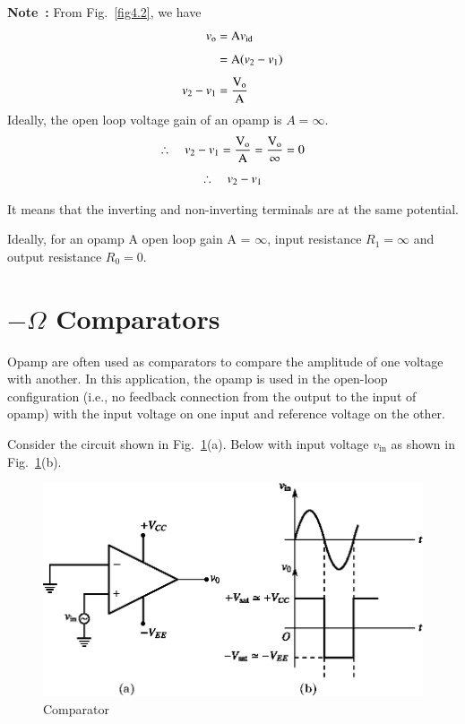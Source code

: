 \medskip
\noindent
{\bf Note~:} From Fig.~\ref{fig4.2}, we have
\begin{align*}
v_{\textrm{o}} &=\textrm{A} v_{\operatorname{id}}\\[4pt]
 &= \textrm{A} (v_{2}-v_{1})\\[4pt]
v_{2}-v_{1} &= \frac{\textrm{V}_{\textrm{o}}}{\textrm{A}}
\end{align*}
Ideally, the open loop voltage gain of an opamp is $A=\infty$.
\begin{gather*}
\therefore\quad v_{2}-v_{1}=\frac{\textrm{V}_{\textrm{o}}}{\textrm{A}}=\frac{\textrm{V}_{\textrm{o}}}{\infty}=0\\[4pt]
\therefore\quad v_{2}-v_{1}
\end{gather*}

It means that the inverting and non-inverting terminals are at the same potential.

Ideally, for an opamp A open loop gain A = $\infty$, input resistance $R_{1}=\infty$ and output resistance $R_{0}=0$.

\section{\boldmath$-\Omega$ Comparators}\label{sec4.2}

Opamp are often used as comparators to compare the amplitude of one voltage with another. In this application, the opamp is used in the open-loop configuration (i.e., no feedback connection from the output to the input of opamp) with the input voltage on one input and reference voltage on the other.

Consider the circuit shown in Fig.~\ref{fig4.4}(a). Below with input voltage $v_{\text{in}}$ as shown in Fig.~\ref{fig4.4}(b).
\begin{figure}[H]
\centering
\includegraphics{chap4/fig4.4.eps}
\caption{Comparator}\label{fig4.4}
\end{figure}

